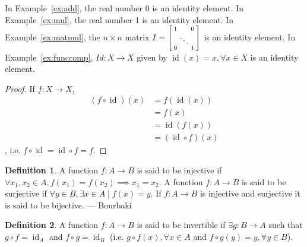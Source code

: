 \documentclass[12pt,letterpaper,DIV=11,final]{scrartcl}
\theoremstyle{plain}
\theoremstyle{definition}
\newtheorem{definition}{Definition}[section]
\theoremstyle{remark}
\DeclareMathOperator{\id}{id}
\begin{document}
In Example~\ref{ex:add}, the real number 0 is an identity element.
In Example~\ref{ex:mul}, the real number 1 is an identity element.
In Example~\ref{ex:matmul}, the $n \times n$ matrix $I = \begin{bsmallmatrix}
1 & & 0 \\ & \ddots & \\ 0 & & 1 \end{bsmallmatrix}$ is an identity element.
In Example~\ref{ex:funccomp}, $Id: X \to X$ given by $\id(x) = x, \forall x \in X$ is an identity element.
\begin{proof}
  If $f: X \to X$,
  \begin{align*}
    (f \circ \id)(x) &= f(\id(x)) \\
                     &= f(x) \\
                     &= \id(f(x)) \\
                     &= (\id \circ f)(x)
  \end{align*}, i.e. $f \circ \id = \id \circ f = f$.
\end{proof}

\begin{definition}
  A function $f: A \to B$ is said to be injective if $\forall x_1, x_2 \in A, f(x_1) = f(x_2) \implies x_1 = x_2$.
  A function $f: A \to B$ is said to be surjective if $\forall y \in B, \exists x \in A \mid f(x) = y$.
  If $f: A \to B$ is injective and surjective it is said to be bijective.
  --- Bourbaki
\end{definition}

\begin{definition}
  A function $f: A \to B$ is said to be invertible if $\exists g: B \to A$ such that $g \circ f = \id_A$ and $f \circ g = \id_B$
  (i.e. $g \circ f(x), \forall x \in A$ and $f \circ g(y) = y, \forall y \in B$).
\end{definition}
\end{document}
